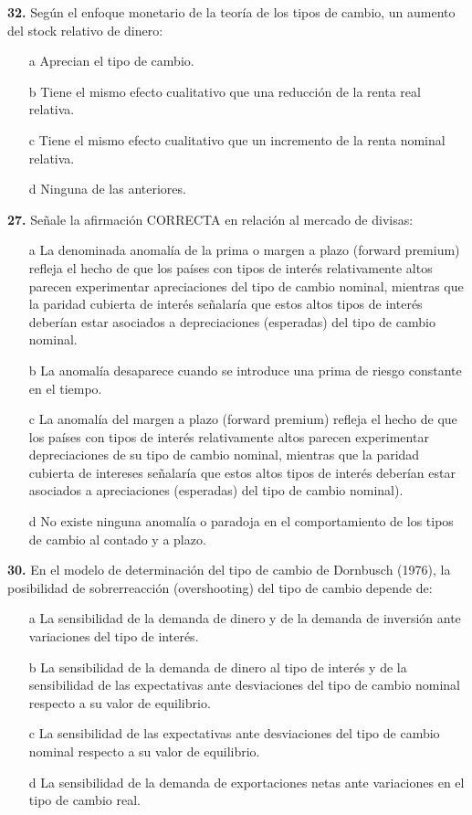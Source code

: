 \documentclass{nuevotema}
\begin{document}
\textbf{32.} Según el enfoque monetario de la teoría de los tipos de cambio, un aumento del stock relativo de dinero:
\begin{enumerate}
	\item[a] Aprecian el tipo de cambio.
	\item[b] Tiene el mismo efecto cualitativo que una reducción de la renta real relativa.
	\item[c] Tiene el mismo efecto cualitativo que un incremento de la renta nominal relativa.
	\item[d] Ninguna de las anteriores.
\end{enumerate}


\textbf{27.} Señale la afirmación CORRECTA en relación al mercado de divisas:
\begin{enumerate}
	\item[a] La denominada anomalía de la prima o margen a plazo (forward premium) refleja el hecho de que los países con tipos de interés relativamente altos parecen experimentar apreciaciones del tipo de cambio nominal, mientras que la paridad cubierta de interés señalaría que estos altos tipos de interés deberían estar asociados a depreciaciones (esperadas) del tipo de cambio nominal.
	\item[b] La anomalía desaparece cuando se introduce una prima de riesgo constante en el tiempo.
	\item[c] La anomalía del margen a plazo (forward premium) refleja el hecho de que los países con tipos de interés relativamente altos parecen experimentar depreciaciones de su tipo de cambio nominal, mientras que la paridad cubierta de intereses señalaría que estos altos tipos de interés deberían estar asociados a apreciaciones (esperadas) del tipo de cambio nominal).
	\item[d] No existe ninguna anomalía o paradoja en el comportamiento de los tipos de cambio al contado y a plazo. 
\end{enumerate}

\textbf{30.} En el modelo de determinación del tipo de cambio de Dornbusch (1976), la posibilidad de sobrerreacción (overshooting) del tipo de cambio depende de:
\begin{enumerate}
	\item[a] La sensibilidad de la demanda de dinero y de la demanda de inversión ante variaciones del tipo de interés.
	\item[b] La sensibilidad de la demanda de dinero al tipo de interés y de la sensibilidad de las expectativas ante desviaciones del tipo de cambio nominal respecto a su valor de equilibrio.
	\item[c] La sensibilidad de las expectativas ante desviaciones del tipo de cambio nominal respecto a su valor de equilibrio.
	\item[d] La sensibilidad de la demanda de exportaciones netas ante variaciones en el tipo de cambio real.
\end{enumerate}
\end{document}

